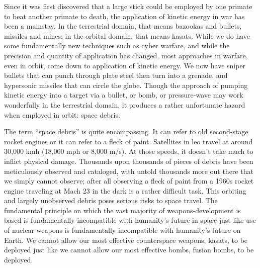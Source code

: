 {}

\titlenote{}

\maketitle

\pagestyle{theRest}
\thispagestyle{firstPage}

Since it was first discovered that a large stick could be employed by
one primate to beat another primate to death, the application of
kinetic energy in war has been a mainstay.  In the terrestrial domain,
that means bazookas and bullets, missiles and mines; in the orbital
domain, that means \acp{kasat}.  While we do have some fundamentally
new techniques such as cyber warfare\cite{big-risks}, and while the
precision and quantity of application has changed, most approaches in
warfare, even in orbit, come down to application of kinetic
energy.\cite{brian} We now have sniper bullets that can punch through
plate steel then turn into a grenade\cite[fancy sniper bullets]{xxx},
and hypersonic missiles that can circle the globe.\cite[chinese
  hypersonic]{xxx} Though the approach of pumping kinetic energy into
a target via a bullet, or bomb, or pressure-wave may work wonderfully
in the terrestrial domain, it produces a rather unfortunate hazard
when employed in orbit: space debris.

The term ``space debris'' is quite encompassing.  It can refer to old
second-stage rocket engines\cite[just about anything]{xxx} or it can
refer to a fleck of paint\cite[iss window]{xxx}.  Satellites in
\ac{leo} travel at around 30,000 kmh (18,000 mph or 8,000
m/s).\cite[hyperphysics]{xxx} At those speeds, it doesn't take much to
inflict physical damage.  Thousands upon thousands of pieces of debris
have been meticulously observed and cataloged, with untold thousands
more out there that we simply cannot observe; after all observing a
fleck of paint from a 1960s rocket engine traveling at Mach 23 in the
dark is a rather difficult task.  This orbiting and largely unobserved
debris poses serious risks to space travel.  The fundamental principle
on which the vast majority of weapons-development is based is
fundamentally incompatible with humanity's future in space just like
use of nuclear weapons is fundamentally incompatible with humanity's
future on Earth.  We cannot allow our most effective counterspace
weapons, \acp{kasat}, to be deployed just like we cannot allow our
most effective bombs, fusion bombs, to be deployed.

